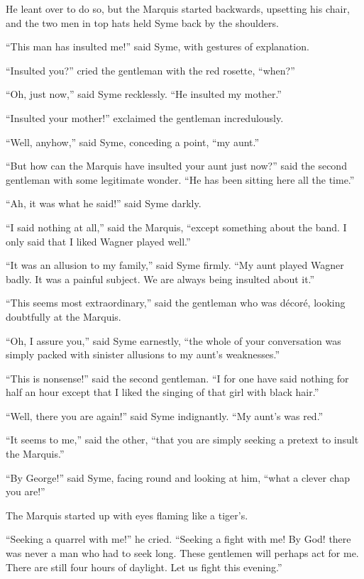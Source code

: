 He leant over to do so, but the Marquis started backwards, upsetting his chair, and the two men in top hats held Syme back by the shoulders.

“This man has insulted me!” said Syme, with gestures of explanation.

“Insulted you?” cried the gentleman with the red rosette, “when?”

“Oh, just now,” said Syme recklessly. “He insulted my mother.”

“Insulted your mother!” exclaimed the gentleman incredulously.

“Well, anyhow,” said Syme, conceding a point, “my aunt.”

“But how can the Marquis have insulted your aunt just now?” said the second gentleman with some legitimate wonder. “He has been sitting here all the time.”

“Ah, it was what he said!” said Syme darkly.

“I said nothing at all,” said the Marquis, “except something about the band. I only said that I liked Wagner played well.”

“It was an allusion to my family,” said Syme firmly. “My aunt played Wagner badly. It was a painful subject. We are always being insulted about it.”

“This seems most extraordinary,” said the gentleman who was décoré, looking doubtfully at the Marquis.

“Oh, I assure you,” said Syme earnestly, “the whole of your conversation was simply packed with sinister allusions to my aunt’s weaknesses.”

“This is nonsense!” said the second gentleman. “I for one have said nothing for half an hour except that I liked the singing of that girl with black hair.”

“Well, there you are again!” said Syme indignantly. “My aunt’s was red.”

“It seems to me,” said the other, “that you are simply seeking a pretext to insult the Marquis.”

“By George!” said Syme, facing round and looking at him, “what a clever chap you are!”

The Marquis started up with eyes flaming like a tiger’s.

“Seeking a quarrel with me!” he cried. “Seeking a fight with me! By God! there was never a man who had to seek long. These gentlemen will perhaps act for me. There are still four hours of daylight. Let us fight this evening.”

